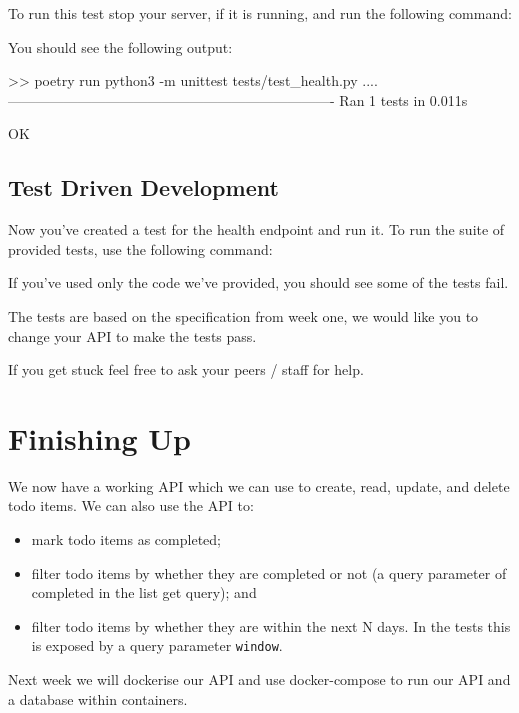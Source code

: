 \documentclass{csse4400}
\begin{document}
To run this test stop your server, if it is running, and run the following command:


You should see the following output:

\begin{code}[language=bash,numbers=none]{}
  >> poetry run python3 -m unittest tests/test_health.py
  ....
  ----------------------------------------------------------------------
  Ran 1 tests in 0.011s

  OK
\end{code}

\subsection{Test Driven Development}

Now you've created a test for the health endpoint and run it.
To run the suite of provided tests,
use the following command:


If you've used only the code we've provided,
you should see some of the tests fail.

The tests are based on the specification from week one,
we would like you to change your API to make the tests pass.


If you get stuck feel free to ask your peers / staff for help.

\section{Finishing Up}

We now have a working API which we can use to create, read, update, and delete todo items.
We can also use the API to:
\begin{itemize}
  \item mark todo items as completed;
  \item filter todo items by whether they are completed or not (a query parameter of completed in the list get query); and
  \item filter todo items by whether they are within the next N days. In the tests this is exposed by a query parameter \texttt{window}.
\end{itemize}

Next week we will dockerise our API and use docker-compose to run our API and a database within containers.



\end{document}
